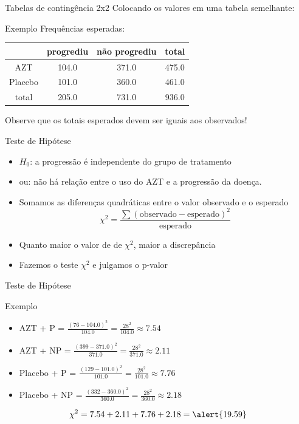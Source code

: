 \documentclass{beamer}
\begin{document}
\begin{frame}{Tabelas de contingência 2x2}
Colocando os valores em uma tabela semelhante:
  \begin{exampleblock}{Exemplo}
    Frequências esperadas:
    \begin{tabular}{c|c|c|c}
      & progrediu & não progrediu & total\\
      \hline
      AZT & 104.0 & 371.0 & 475.0\\
      \hline
      Placebo & 101.0 & 360.0 & 461.0\\
      \hline
      total & 205.0 & 731.0 & 936.0\\
    \end{tabular}
  \end{exampleblock}
Observe que os totais esperados devem ser iguais aos observados!
\end{frame}

\begin{frame}{Teste de Hipótese}
  \begin{itemize}
    \small
  \item $H_0$: a progressão é independente do grupo de tratamento
  \item ou: não há relação entre o uso do AZT e a progressão da doença.
    \bigskip
    \scriptsize
  \item Somamos as diferenças quadráticas entre o valor observado
    e o esperado
    \begin{displaymath}
      \chi^2 = \frac{\sum (\text{observado} - \text{esperado})^2 }{\text{esperado}}
    \end{displaymath}
    \bigskip
    \footnotesize
  \item Quanto maior o valor de de $\chi^2$, maior a discrepância
  \item Fazemos o teste $\chi^2$ e julgamos o p-valor
  \end{itemize}
\end{frame}

\begin{frame}{Teste de Hipótese}
  \begin{exampleblock}{Exemplo}
    \begin{itemize}
      \scriptsize
    \item AZT + P = $\frac{(76 - 104.0)^2}{104.0} = \frac{28^2}{104.0}
      \approx 7.54$
    \item AZT + NP = $\frac{(399 - 371.0)^2}{371.0} =
      \frac{28^2}{371.0} \approx 2.11$
    \item Placebo + P = $\frac{(129 - 101.0)^2}{101.0} =
      \frac{28^2}{101.0} \approx 7.76$
    \item Placebo + NP = $\frac{(332 - 360.0)^2}{360.0} =
      \frac{28^2}{360.0} \approx 2.18$
    \end{itemize}
    \small
    \bigskip
    \begin{exampleblock}{}
      $$\chi^2 = 7.54 + 2.11 + 7.76 + 2.18 = \alert{19.59}$$
    \end{exampleblock}
  \end{exampleblock}
\end{frame}
\end{document}
